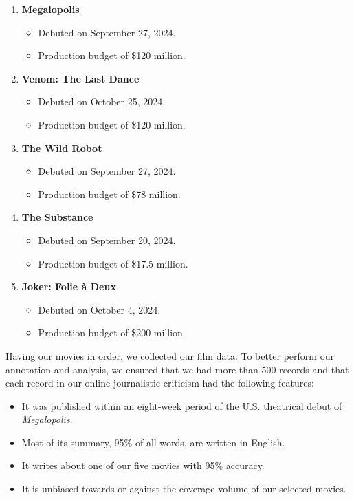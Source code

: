 \documentclass[letterpaper]{article} %
\begin{document}
\begin{enumerate}
    \item \textbf{Megalopolis}
    \begin{itemize}
        \item Debuted on September 27, 2024.
        \item Production budget of \$120 million.
    \end{itemize}
    
    \item \textbf{Venom: The Last Dance}
    \begin{itemize}
        \item Debuted on October 25, 2024.
        \item Production budget of \$120 million.
    \end{itemize}
    
    \item \textbf{The Wild Robot}
    \begin{itemize}
        \item Debuted on September 27, 2024.
        \item Production budget of \$78 million.
    \end{itemize}
    
    \item \textbf{The Substance}
    \begin{itemize}
        \item Debuted on September 20, 2024.
        \item Production budget of \$17.5 million.
    \end{itemize}
    
    \item \textbf{Joker: Folie à Deux}
    \begin{itemize}
        \item Debuted on October 4, 2024.
        \item Production budget of \$200 million.
    \end{itemize}
\end{enumerate}

Having our movies in order, we collected our film data. To better perform our annotation and analysis, we ensured that we had more than 500 records and that each record in our online journalistic criticism had the following features:

\begin{itemize}
    \item It was published within an eight-week period of the U.S. theatrical debut of \textit{Megalopolis}.
    
    \item Most of its summary, 95\% of all words, are written in English.
    
    \item It writes about one of our five movies with 95\% accuracy.
    
    \item It is unbiased towards or against the coverage volume of our selected movies.
\end{itemize}
\end{document}
